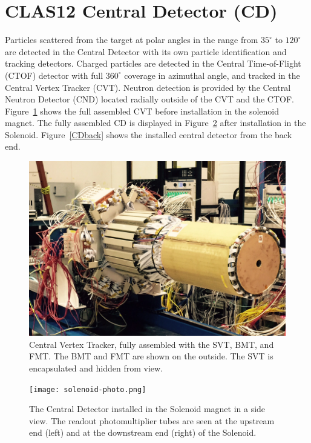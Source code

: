 \documentclass[final,3p,times,twocolumn,authoryear]{elsarticle}
\begin{document}
\section{CLAS12 Central Detector (CD)} 
Particles scattered from the target at polar angles in the range from $35^\circ$  to $120^\circ$ are detected in the Central Detector with its own particle identification and tracking detectors. Charged particles are detected in the Central Time-of-Flight (CTOF) detector with full $360^\circ$ coverage in azimuthal angle, and tracked in the Central Vertex Tracker (CVT). Neutron detection is provided by the Central Neutron Detector (CND) located radially outside of the CVT and the CTOF.  Figure~\ref{CVT} shows the full assembled CVT before installation in the solenoid magnet. The fully assembled CD is displayed in  Figure~\ref{CDinSol} after installation in the Solenoid.  Figure~\ref{CDback} shows the installed central detector from the back end.    

\begin{figure}[htbp!]
\centerline{\includegraphics[width=1.0\columnwidth]{CVT.png}}
\caption{ \rm Central Vertex Tracker, fully assembled with the SVT, BMT, and FMT. The BMT and FMT are shown on the outside. The SVT is encapsulated and hidden from view. }
\label{CVT}
\end{figure}

\begin{figure}[htbp!]
\centerline{\texttt{[image: solenoid-photo.png]}}
\caption{The Central Detector installed in the Solenoid magnet in a side view. The readout photomultiplier tubes are seen at the upstream end (left) and at the downstream end (right) of the Solenoid. }
\label{CDinSol}
\end{figure}
\end{document}
